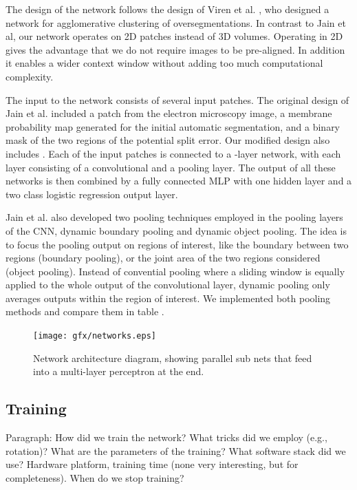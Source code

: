 The design of the network follows the design of Viren et al. , who designed a network for agglomerative clustering of oversegmentations. In contrast to Jain et al, our network operates on 2D patches instead of 3D volumes. Operating in 2D gives the advantage that we do not require images to be pre-aligned. In addition it enables a wider context window without adding too much computational complexity. 

The input to the network consists of several input patches. The original design of Jain et al. included a patch from the electron microscopy image, a membrane probability map generated for the initial automatic segmentation, and a binary mask of the two regions of the potential split error. Our modified design also includes . 
Each of the input patches is connected to a -layer network, with each layer consisting of a convolutional and a pooling layer. The output of all these networks is then combined by a fully connected MLP with one hidden layer and a two class logistic regression output layer. 

Jain et al. also developed two pooling techniques employed in the pooling layers of the CNN, dynamic boundary pooling and dynamic object pooling. The idea is to focus the pooling output on regions of interest, like the boundary between two regions (boundary pooling), or the joint area of the two regions considered (object pooling). Instead of convential pooling where a sliding window is equally applied to the whole output of the convolutional layer, dynamic pooling only averages outputs within the region of interest. We implemented both pooling methods and compare them in table .

\begin{figure}[t]
\texttt{[image: gfx/networks.eps]}
\caption{Network architecture diagram, showing parallel sub nets that feed into a multi-layer perceptron at the end.}
\end{figure}

\subsection{Training}

Paragraph: How did we train the network? What tricks did we employ (e.g., rotation)? What are the parameters of the training? What software stack did we use? Hardware platform, training time (none very interesting, but for completeness). When do we stop training?



